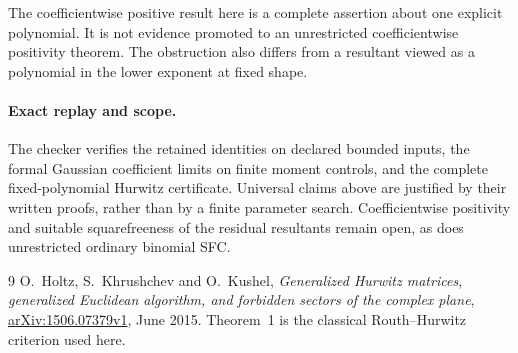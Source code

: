 \documentclass[11pt]{article}
\begin{document}
The coefficientwise positive result here is a complete assertion about
one explicit polynomial. It is not evidence promoted to an unrestricted
coefficientwise positivity theorem. The obstruction also differs from
a resultant viewed as a polynomial in the lower exponent at fixed shape.

\paragraph{Exact replay and scope.}
The checker verifies the retained identities on declared bounded inputs,
the formal Gaussian coefficient limits on finite moment controls, and
the complete fixed-polynomial Hurwitz certificate. Universal claims
above are justified by their written proofs, rather than by a finite
parameter search. Coefficientwise positivity and suitable squarefreeness
of the residual resultants remain open, as does unrestricted ordinary
binomial SFC.

\begin{thebibliography}{9}
O.~Holtz, S.~Khrushchev and O.~Kushel,
\emph{Generalized Hurwitz matrices, generalized Euclidean algorithm,
and forbidden sectors of the complex plane},
\href{https://arxiv.org/abs/1506.07379v1}{arXiv:1506.07379v1},
June 2015. Theorem~1 is the classical Routh--Hurwitz criterion used here.
\end{thebibliography}
\end{document}
